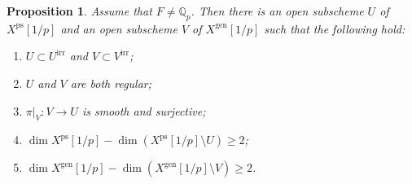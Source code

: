 \documentclass{amsart}
\newtheorem{prop}{Proposition}[section]
\theoremstyle{definition}
\theoremstyle{remark}
\newcommand{\Qp}{\mathbb {Q}_p}
\newcommand{\gen}{\mathrm{gen}}
\newcommand{\irr}{\mathrm{irr}}
\newcommand{\ps}{\mathrm{ps}}
\begin{document}
\begin{prop}\label{nice_locus} Assume that $F\neq \Qp$. Then there is an open  subscheme $U$ of $X^{\ps}[1/p]$
and an open subscheme $V$ of $X^{\gen}[1/p]$ such that the  following hold:
\begin{enumerate}
\item $U\subset U^{\irr}$ and $V\subset V^{\irr}$;
\item $U$ and $V$ are both regular;
\item $\pi|_V:V\rightarrow U$ is smooth and surjective;
\item $\dim X^{\ps}[1/p] - \dim (X^{\ps}[1/p]\setminus U) \ge 2$;
\item 
$\dim X^{\gen}[1/p] - \dim (X^{\gen}[1/p]\setminus V)\ge 2$.
\end{enumerate} 
 \end{prop} 
\end{document}
